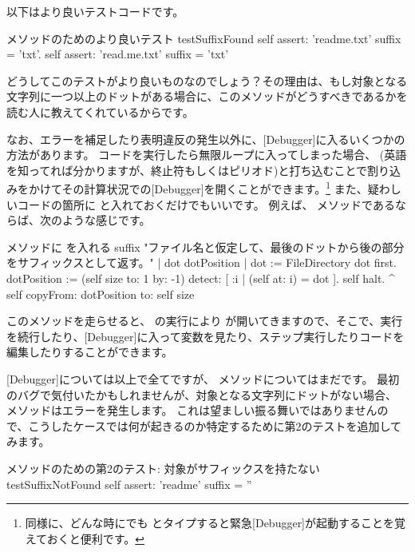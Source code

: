 \documentclass[a4paper,10pt,twoside]{book}
\begin{document}
以下はより良いテストコードです。

\begin{method}[testSuffix2]{ メソッドのためのより良いテスト}
testSuffixFound
	self assert: 'readme.txt' suffix = 'txt'.
	self assert: 'read.me.txt' suffix = 'txt'
\end{method}
\noindent
どうしてこのテストがより良いものなのでしょう？その理由は、もし対象となる文字列に一つ以上のドットがある場合に、このメソッドがどうすべきであるかを読む人に教えてくれているからです。

なお、エラーを補足したり表明違反の発生以外に、[Debugger]に入るいくつかの方法があります。
コードを実行したら無限ループに入ってしまった場合、  (英語を知ってれば分かりますが、終止符もしくはピリオド)と打ち込むことで割り込みをかけてその計算状況での[Debugger]を開くことができます。\footnote{同様に、どんな時にでも  とタイプすると緊急[Debugger]が起動することを覚えておくと便利です。}
また、疑わしいコードの箇所に  と入れておくだけでもいいです。
例えば、 メソッドであるならば、次のような感じです。

\needspace{11ex}
\begin{method}[suffix]{ メソッドに  を入れる}
suffix
	"ファイル名と仮定して、最後のドットから後の部分をサフィックスとして返す。"
        	| dot dotPosition |
	dot := FileDirectory dot first.
	dotPosition := (self size to: 1 by: -1) detect: [ :i | (self at: i) = dot ].
	self halt.
	^ self copyFrom: dotPosition to: self size 
\end{method}

このメソッドを走らせると、  の実行により  が開いてきますので、そこで、実行を続行したり、[Debugger]に入って変数を見たり、ステップ実行したりコードを編集したりすることができます。

[Debugger]については以上で全てですが、  メソッドについてはまだです。
最初のバグで気付いたかもしれませんが、対象となる文字列にドットがない場合、 メソッドはエラーを発生します。
これは望ましい振る舞いではありませんので、こうしたケースでは何が起きるのか特定するために第2のテストを追加してみます。

\begin{method}[testNoSuffix]{ メソッドのための第2のテスト: 対象がサフィックスを持たない}
testSuffixNotFound
	self assert: 'readme' suffix = ''
\end{method}

\end{document}
